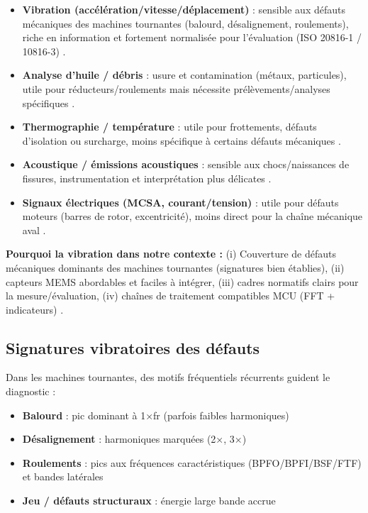 \begin{itemize}
\item \textbf{Vibration (accélération/vitesse/déplacement)} : sensible aux défauts mécaniques des machines tournantes (balourd, désalignement, roulements), riche en information et fortement normalisée pour l'évaluation (ISO 20816-1 / 10816-3) \cite{iso20816-1,iso20816-3,tiboni2022,matania2024}.

\item \textbf{Analyse d'huile / débris} : usure et contamination (métaux, particules), utile pour réducteurs/roulements mais nécessite prélèvements/analyses spécifiques \cite{iso17359,hector2024}.

\item \textbf{Thermographie / température} : utile pour frottements, défauts d'isolation ou surcharge, moins spécifique à certains défauts mécaniques \cite{iso17359,hector2024}.

\item \textbf{Acoustique / émissions acoustiques} : sensible aux chocs/naissances de fissures, instrumentation et interprétation plus délicates \cite{tiboni2022,hector2024}.

\item \textbf{Signaux électriques (MCSA, courant/tension)} : utile pour défauts moteurs (barres de rotor, excentricité), moins direct pour la chaîne mécanique aval \cite{hector2024,achouch2022}.
\end{itemize}

\textbf{Pourquoi la vibration dans notre contexte :} (i) Couverture de défauts mécaniques dominants des machines tournantes (signatures bien établies), (ii) capteurs MEMS abordables et faciles à intégrer, (iii) cadres normatifs clairs pour la mesure/évaluation, (iv) chaînes de traitement compatibles MCU (FFT + indicateurs) \cite{iso20816-1,iso20816-3,tiboni2022,matania2024}.

\subsection{Signatures vibratoires des défauts}

Dans les machines tournantes, des motifs fréquentiels récurrents guident le diagnostic :

\begin{itemize}
\item \textbf{Balourd} : pic dominant à 1×fr (parfois faibles harmoniques)
\item \textbf{Désalignement} : harmoniques marquées (2×, 3×)
\item \textbf{Roulements} : pics aux fréquences caractéristiques (BPFO/BPFI/BSF/FTF) et bandes latérales
\item \textbf{Jeu / défauts structuraux} : énergie large bande accrue
\end{itemize}

